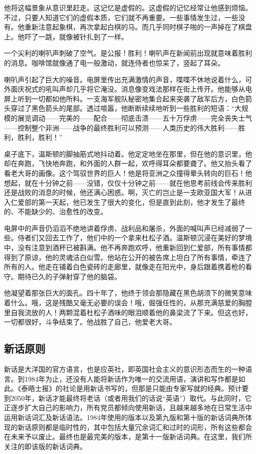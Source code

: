 他将这幅景象从意识里赶走。这记忆是虚假的。这虚假的记忆经常让他感到烦恼。不过，只要人知道它们的虚假本质，它们就不再重要。一些事情发生过，一些没有。他重新注意起象棋，再次拿起白棋的马。而几乎同时棋子啪的一声掉在了棋盘上。他吓了一跳，就像被针扎到了一样。

一个尖利的喇叭声刺破了空气。是公报！胜利！喇叭声在新闻前出现就意味着胜利的消息。咖啡馆就像通了电一般激动，就连侍者也惊呆了，竖起了耳朵。

喇叭声引起了巨大的噪音。电屏里传出充满激情的声音，喋喋不休地说着什么，可外面庆祝式的吼叫声却几乎将它淹没。消息像变戏法那样在街上传开。他能够从电屏上听到一切都如他所料。一支海军舰队秘密地集合起来突袭了敌军后方，白色箭头穿过了黑色箭头的尾部。透过喧嚣，他断断续续地听到一些胜利的短语：``大规模的展览调动------完美的------配合------彻底击溃------五十万俘虏------完全丧失士气------控制整个非洲------战争的最终胜利可以预测------人类历史的伟大胜利------胜利，胜利，胜利！''

桌子底下，温斯顿的脚抽筋式地抖动着。他定定地坐在那里，但在他的意识里，他却在奔跑，飞快地奔跑，和外面的人群一起，欢呼得耳朵都要聋了。他又抬头看了看老大哥的画像。这个驾驭世界的巨人！他是将亚洲之众撞得晕头转向的巨石！他想起，就在十分钟之前------没错，仅仅十分钟之前------就在他思考前线会传来胜利还是战败的消息的时候，他还满心困惑。啊，灭亡的岂止是一支欧亚国大军！从进入仁爱部的第一天起，他已发生了很大的变化，但是直到此刻，他才发生了最终的、不能缺少的、治愈性的改变。

电屏中的声音仍滔滔不绝地讲着俘虏、战利品和屠杀，外面的喊叫声已经减弱了一些。侍者们又回去工作了，他们中的一个拿来杜松子酒。温斯顿沉浸在美好的梦境中，没有注意到酒杯已被斟满。他不再奔跑欢呼，他重新回到仁爱部，所有事情都得到了原谅，他的灵魂洁白似雪。他站在公开的被告席上坦白了所有事情，牵连了所有的人。他走在铺着白色瓷砖的走廊里，就像走在阳光中，身后跟着携着枪的看守。期待已久的子弹射穿了他的脑袋。

他凝望着那张巨大的面孔。四十年了，他终于领会那隐藏在黑色胡须下的微笑意味着什么。哦，这是残酷又毫无必要的误会！哦，倔强任性的，从那充满慈爱的胸膛里自我流放的人！两颗混着杜松子酒味的眼泪顺着他的鼻梁流了下来。但这也好，一切都很好，斗争结束了。他战胜了自己，他爱老大哥。

\subsection{新话原则}\label{ux65b0ux8bddux539fux5219}

新话是大洋国的官方语言，也是应英社，即英国社会主义的意识形态而生的一种语言。到1984年为止，还没有人能将新话作为唯一的交流用语，演讲和写作都是如此。《泰晤士报》的社论是用新话书写的，但那是只能由专家写就的经典。预计要到2050年，新话才能最终将老话（或者用我们的话说``英语''）取代。与此同时，它正逐步扩大自己的影响力，所有党员都倾向使用新话，且越来越多地在日常生活中运用新话词汇及新话语法。1984年使用的版本以及第九版和第十版的新话词典所体现的新话原则都是临时性的，其中包括大量冗余词汇和过时的词形，所有这些都会在未来予以废止。最终也是最完美的版本，是第十一版新话词典。在这里，我们所关注的即该版的新话词典。

